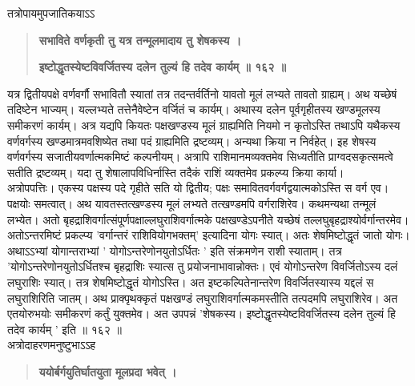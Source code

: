 \documentclass[11pt, openany]{book}
\begin{document}
\begin{sloppypar}
\hangindent=0.2in तत्रोपायमुपजातिकयाऽऽ\textendash

\begin{quote}
\hspace{0.5in}\textbf{सभाविते वर्णकृती तु यत्र तन्मूलमादाय तु शेषकस्य ।}

\hspace{0.5in}\textbf{इष्टोद्धृतस्येष्टविवर्जितस्य दलेन तुल्यं हि तदेव कार्यम् ॥ १६२ ॥}
\end{quote}

\hangindent=0.2in \hspace{0.2in}यत्र द्वितीयपक्षे वर्णवर्गौ सभावितौ स्यातां तत्र तदन्तर्वर्तिनो यावतो मूलं लभ्यते तावतो ग्राह्यम्। अथ यच्छेषं तदिष्टेन भाज्यम्। यल्लभ्यते तत्तेनैवेष्टेन वर्जितं च कार्यम्। अथास्य दलेन पूर्वगृहीतस्य खण्डमूलस्य समीकरणं कार्यम्। अत्र यद्यपि कियतः पक्षखण्डस्य मूलं ग्राह्यमिति नियमो न कृतोऽस्ति तथाऽपि यथैकस्य वर्णवर्गस्य खण्डमात्रमवशिष्येत तथा पदं ग्राह्यमिति द्रष्टव्यम्। अन्यथा क्रिया न निर्वहेत्। इह शेषस्य वर्णवर्गस्य सजातीयवर्णात्मकमिष्टं कल्पनीयम्। अत्रापि राशिमानमव्यक्तमेव सिध्यतीति प्राग्वदसकृत्समत्वे सतीति द्रष्टव्यम्। यदा तु शेषालापविधिर्नास्ति तदैकं राशिं व्यक्तमेव प्रकल्प्य क्रिया कार्या।\\

\hangindent=0.2in \hspace{0.2in}अत्रोपपत्तिः। एकस्य पक्षस्य पदे गृहीते सति यो द्वितीय; पक्षः समावितवर्गवर्गद्वयात्मकोऽस्ति स वर्ग एव। पक्षयोः समत्वात्। अथ यावतस्तत्खण्डस्य मूलं लभ्यते तत्खण्डमपि वर्गराशिरेव। कथमन्यथा तन्मूलं लभ्येत। अतो बृहद्राशिवर्गात्संपूर्णपक्षाल्लघुराशिवर्गात्मके पक्षखण्डेऽपनीते यच्छेषं तल्लघुबृहद्राश्योर्वर्गान्तरमेव। अतोऽन्तरमिष्टं प्रकल्प्य 'वर्गान्तरं राशिवियोगभक्तम्' इत्यादिना योगः स्यात्। अतः शेषमिष्टोद्धृतं जातो योगः। अथाऽऽभ्यां योगान्तराभ्यां ' योगोऽन्तरेणोनयुतोऽर्धितः ' इति संक्रमणेन राशी स्याताम्। तत्र 'योगोऽन्तरेणोनयुतोऽर्धितश्च बृहद्राशिः स्यात्स तु प्रयोजनाभावान्नोक्तः। एवं योगोऽन्तरेण विवर्जितोऽस्य दलं लघुराशिः स्यात्। तत्र शेषमिष्टोद्धृतं योगोऽस्ति। अत इष्टकल्पितेनान्तरेण विवर्जितस्यास्य यद्दलं स लघुराशिरिति जातम्। अथ प्राक्पृथक्कृतं पक्षखण्डं लघुराशिवर्गात्मकमस्तीति तत्पदमपि लघुराशिरेव। अत एतयोरुभयोः समीकरणं कर्तुं युक्तमेव। अत उपपन्नं 'शेषकस्य। इष्टोद्धृतस्येष्टविवर्जितस्य दलेन तुल्यं हि तदेव कार्यम् ' इति ॥ १६२ ॥\\

\hangindent=0.2in \hspace{0.2in}अत्रोदाहरणमनुष्टुभाऽऽह\textendash

\begin{quote}
\hspace{1in}\textbf{ययोर्बर्गयुतिर्घातयुता मूलप्रदा भवेत् ।}


\end{quote}
\end{sloppypar}
\end{document}
